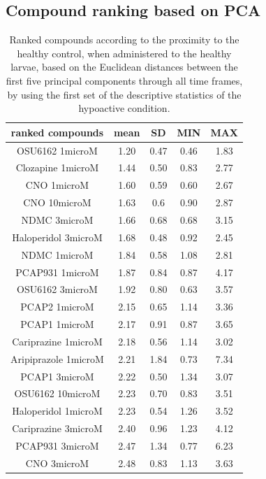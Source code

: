 \documentclass[a4paper,12pt]{article}
\begin{document}
\subsection{Compound ranking based on PCA}
\begin{table}[h!]\tiny
\centering
\caption{Ranked compounds according to the proximity to the healthy control, when administered to the healthy larvae, based on the Euclidean distances between the first five principal components through all time frames, by using the first set of the descriptive statistics of the hypoactive condition.}
\begin{tabular}{|c|c|c|c|c|}
\hline
ranked compounds             & mean & SD   & MIN  & MAX   \\ \hline
OSU6162 1microM       & 1.20  & 0.47 & 0.46 & 1.83  \\ \hline
Clozapine 1microM     & 1.44 & 0.50  & 0.83 & 2.77  \\ \hline
CNO 1microM           & 1.60  & 0.59 & 0.60  & 2.67  \\ \hline
CNO 10microM          & 1.63 & 0.6  & 0.90  & 2.87  \\ \hline
NDMC 3microM          & 1.66 & 0.68 & 0.68 & 3.15  \\ \hline
Haloperidol 3microM   & 1.68 & 0.48 & 0.92 & 2.45  \\ \hline
NDMC 1microM          & 1.84 & 0.58 & 1.08 & 2.81  \\ \hline
PCAP931 1microM       & 1.87 & 0.84 & 0.87 & 4.17  \\ \hline
OSU6162 3microM       & 1.92 & 0.80  & 0.63 & 3.57  \\ \hline
PCAP2 1microM         & 2.15 & 0.65 & 1.14 & 3.36  \\ \hline
PCAP1 1microM         & 2.17 & 0.91 & 0.87 & 3.65  \\ \hline
Cariprazine 1microM   & 2.18 & 0.56 & 1.14 & 3.02  \\ \hline
Aripiprazole 1microM  & 2.21 & 1.84 & 0.73 & 7.34  \\ \hline
PCAP1 3microM         & 2.22 & 0.50  & 1.34 & 3.07  \\ \hline
OSU6162 10microM      & 2.23 & 0.70  & 0.83 & 3.51  \\ \hline
Haloperidol 1microM   & 2.23 & 0.54 & 1.26 & 3.52  \\ \hline
Cariprazine 3microM   & 2.40  & 0.96 & 1.23 & 4.12  \\ \hline
PCAP931 3microM       & 2.47 & 1.34 & 0.77 & 6.23  \\ \hline
CNO 3microM           & 2.48 & 0.83 & 1.13 & 3.63  \\ \hline

\end{tabular}
\end{table}
\end{document}
